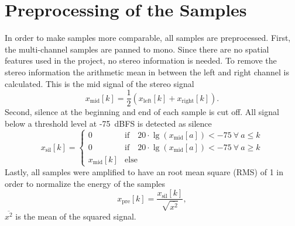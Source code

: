 \section{Preprocessing of the Samples}
\label{sec:Preprocessing}
In order to make samples more comparable, all samples are preprocessed. First, the multi-channel samples are panned to mono. Since there are no spatial features used in the project, no stereo information is needed. To remove the stereo information the arithmetic mean in between the left and right channel is calculated. This is the mid signal of the stereo signal
\[
    x_\text{mid}[k] = \frac{1}{2} \left( x_\text{left}[k] + x_\text{right}[k] \right).
\]
Second, silence at the beginning and end of each sample is cut off. All signal below a threshold level at -75~dBFS is detected as silence
\[
    x_\text{sil}[k] = 
    \begin{cases}
          0 & \text{if} \quad 20\cdot \lg(x_\text{mid}[a]) < -75~\forall~a \leq k\\
          0 & \text{if} \quad 20\cdot \lg(x_\text{mid}[a]) < -75~\forall~a \geq k\\
          x_\text{mid}[k] & \text{else}
    \end{cases}
\]
Lastly, all samples were amplified to have an root mean square (RMS) of 1 in order to normalize the energy of the samples
\[
    x_\text{pre}[k] = \frac{x_\text{sil}[k]}{\sqrt{\overline{x^2}}},
\]
$\overline{x^2}$ is the mean of the squared signal.